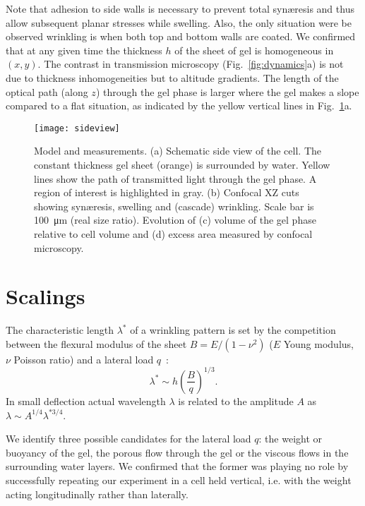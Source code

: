 \documentclass[twocolumn,superscriptaddress,showpacs,preprintnumbers,
amsmath,amssymb,prl]{revtex4-1}
\begin{document}
Note that adhesion to side walls is necessary to prevent total syn\ae{}resis and thus allow subsequent planar stresses while swelling. Also, the only situation were be observed wrinkling is when both top and bottom walls are coated. We confirmed that at any given time the thickness $h$ of the sheet of gel is homogeneous in $(x,y)$. The contrast in transmission microscopy (Fig.~\ref{fig:dynamics}a) is not due to thickness inhomogeneities but to altitude gradients. The length of the optical path (along $z$) through the gel phase is larger where the gel makes a slope compared to a flat situation, as indicated by the yellow vertical lines in Fig.~\ref{fig:sideview}a.

\begin{figure}
	\texttt{[image: sideview]}
	\caption{Model and measurements. (a) Schematic side view of the cell. The constant thickness gel sheet (orange) is surrounded by water. Yellow lines show the path of transmitted light through the gel phase. A region of interest is highlighted in gray. (b) Confocal XZ cuts showing syn\ae{}resis, swelling and (cascade) wrinkling. Scale bar is \SI{100}{\micro\metre} (real size ratio). Evolution of (c) volume of the gel phase relative to cell volume and (d) excess area measured by confocal microscopy.}
	\label{fig:sideview}
\end{figure}

\section*{Scalings}

The characteristic length $\lambda^*$ of a wrinkling pattern is set by the competition between the flexural modulus of the sheet $B=E/(1-\nu^2)$ ($E$ Young modulus, $\nu$ Poisson ratio) and a lateral load $q$~\cite{Vella2009,Kolinski2009}: 
\begin{equation}
\lambda^* \sim h \left(\frac{B}{q}\right)^{1/3}.
\label{eq:lstar}
\end{equation}
In small deflection actual wavelength $\lambda$ is related to the amplitude $A$ as $\lambda \sim A^{1/4} \lambda^{*3/4}$.

We identify three possible candidates for the lateral load $q$: the weight or buoyancy of the gel, the porous flow through the gel or the viscous flows in the surrounding water layers. We confirmed that the former was playing no role by successfully repeating our experiment in a cell held vertical, i.e. with the weight acting longitudinally rather than laterally.
\end{document}
